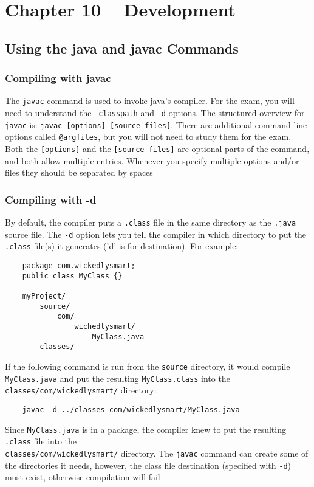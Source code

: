 \section{Chapter 10 -- Development}
\subsection{Using the java and javac Commands}
\subsubsection{Compiling with javac}
The \verb#javac# command is used to invoke java's compiler. For the exam, you 
will need to understand the \verb#-classpath# and \verb#-d# options. The 
structured overview for \verb#javac# is: \verb#javac [options] [source files]#.
There are additional command-line options called \verb#@argfiles#, but you will 
not need to study them for the exam. Both the \verb#[options]# and the 
\verb#[source files]# are optional parts of the command, and both allow 
multiple entries. Whenever you specify multiple options and/or files they 
should be separated by spaces

\subsubsection{Compiling with -d}
By default, the compiler puts a \verb#.class# file in the same directory as the 
\verb#.java# source file. The \verb#-d# option lets you tell the compiler in 
which directory to put the \verb#.class# file(s) it generates ('d' is for 
destination). For example:
\begin{verbatim}
    package com.wickedlysmart;
    public class MyClass {}

    myProject/
        source/
            com/
                wichedlysmart/
                    MyClass.java
        classes/
\end{verbatim}
If the following command is run from the \verb#source# directory, it would 
compile \verb#MyClass.java# and put the resulting \verb#MyClass.class# into the 
\verb#classes/com/wickedlysmart/# directory:
\begin{verbatim}
    javac -d ../classes com/wickedlysmart/MyClass.java
\end{verbatim}
Since \verb#MyClass.java# is in a package, the compiler knew to put the 
resulting \verb#.class# file into the\\ \verb#classes/com/wickedlysmart/# 
directory. The \verb#javac# command can create some of the directories it 
needs, however, the class file destination (specified with \verb#-d#) must 
exist, otherwise compilation will fail

